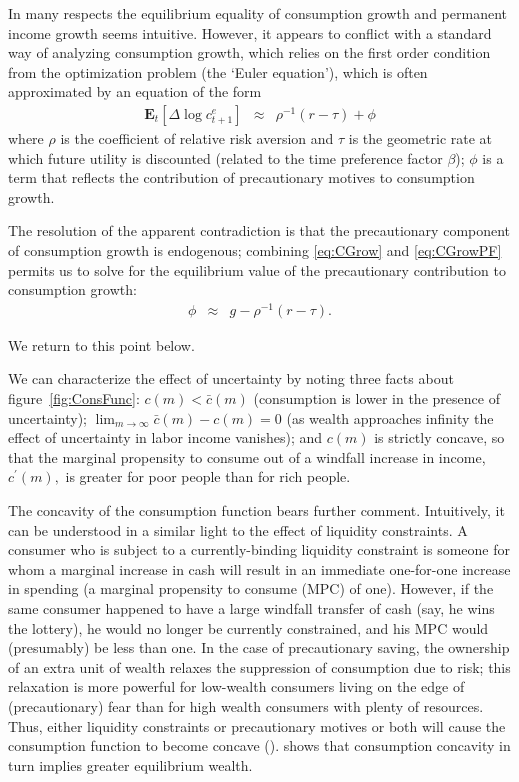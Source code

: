 In many respects the equilibrium equality of consumption growth and
permanent income growth seems intuitive. However, it
appears to conflict with a standard way of analyzing consumption
growth, which relies on the first order condition from the
optimization problem (the `Euler equation'), which is often
approximated by an equation of the form
\begin{eqnarray}
  \label{eq:CGrowPF}
  \mathbf{E}_{t}[\Delta \log {c}^{e}_{t+1}] & \approx & \rho^{-1}(r-\tau) + \phi
\end{eqnarray}
where $\rho$ is the coefficient of relative risk aversion and $\tau$
is the geometric rate at which future utility is discounted (related
to the time preference factor $\beta$); $\phi$ is a term that
reflects the contribution of precautionary motives to consumption
growth.

The resolution of the apparent contradiction is that the precautionary
component of consumption growth is endogenous; combining
\eqref{eq:CGrow} and \eqref{eq:CGrowPF} permits us to solve for the
equilibrium value of the precautionary contribution to consumption
growth:
\begin{eqnarray}
  \label{eq:phi}
  \phi & \approx & g - \rho^{-1}(r-\tau).
\end{eqnarray}

We return to this point below.



We can characterize the effect of uncertainty by noting three facts
about figure~\ref{fig:ConsFunc}: $c({m}) < \bar{c}({m})$ (consumption is lower in the presence of uncertainty);
$\lim_{{m} \rightarrow \infty} \bar{c}({m})-c({m}) = 0$  (as wealth
approaches infinity the effect of uncertainty in labor income vanishes); and
$c({m})$ is strictly concave, so that the marginal propensity to consume
out of a windfall increase in income, $c^{\prime}({m}),$ is greater for
poor people than for rich people.

The concavity of the consumption function bears further comment.
Intuitively, it can be understood in a similar light to the effect of
liquidity constraints. A consumer who is subject to a
currently-binding liquidity constraint is someone for whom a marginal
increase in cash will result in an immediate one-for-one increase in
spending (a marginal propensity to consume (MPC) of one).  However, if
the same consumer happened to have a large windfall transfer of cash
(say, he wins the lottery), he would no longer be currently
constrained, and his MPC would (presumably) be less than one.  In the
case of precautionary saving, the ownership of an extra unit of wealth
relaxes the suppression of consumption due to risk; this relaxation is
more powerful for low-wealth consumers living on the edge of
(precautionary) fear than for high wealth consumers with plenty of
resources.  Thus, either liquidity constraints or precautionary
motives or both will cause the consumption function to become concave
(\cite{carroll&kimball:liquidity}). \cite{huggett:higherW} shows that
consumption concavity in turn implies greater equilibrium wealth.  

